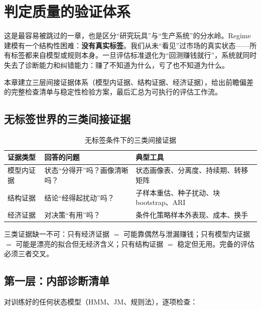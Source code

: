 
\section{判定质量的验证体系}
\label{sec:validation}

这是最容易被跳过的一章，也是区分“研究玩具”与“生产系统”的分水岭。Regime 建模有一个结构性困难：\textbf{没有真实标签}。我们从未“看见”过市场的真实状态——所有标签都来自模型或规则本身。一旦评估标准退化为“回测赚钱就行”，系统就同时失去了诊断能力和纠错能力：赚了不知道为什么，亏了也不知道为什么。

本章建立三层间接证据体系（模型内证据、结构证据、经济证据），给出前瞻偏差的完整检查清单与稳定性检验方案，最后汇总为可执行的评估工作流。

\subsection{无标签世界的三类间接证据}

\begin{table}[htbp]
\centering
\footnotesize
\begin{tabular}{p{2.6cm}p{4.6cm}p{5.4cm}}
\toprule
\textbf{证据类型} & \textbf{回答的问题} & \textbf{典型工具} \\
\midrule
模型内证据 & 状态“分得开”吗？画像清晰吗？ & 状态画像表、分离度、持续期、转移矩阵 \\
结构证据 & 结论“经得起扰动”吗？ & 子样本重估、种子扰动、块 bootstrap、ARI \\
经济证据 & 对决策“有用”吗？ & 条件化策略样本外表现、成本、换手 \\
\bottomrule
\end{tabular}
\caption{无标签条件下的三类间接证据}
\label{tab:validation-evidence}
\end{table}

三类证据缺一不可：只有经济证据 $=$ 可能靠偶然与泄漏赚钱；只有模型内证据 $=$ 可能是漂亮的拟合但无经济含义；只有结构证据 $=$ 稳定但无用。完备的评估必须三者交叉。

\subsection{第一层：内部诊断清单}

对训练好的任何状态模型（HMM、JM、规则法），逐项检查：


